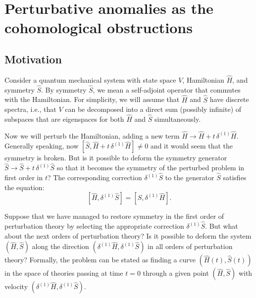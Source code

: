 \documentclass[10pt,a4paper]{amsart}
\theoremstyle{definition}
\begin{document}
\section{Perturbative anomalies as the cohomological obstructions}
\subsection{Motivation}
Consider a quantum mechanical system with state space $V$, Hamiltonian $\hat{H}$, and symmetry $\hat{S}$. By symmetry $\hat{S}$, we mean a self-adjoint operator that commutes with the Hamiltonian. For simplicity, we will assume that $\hat{H}$ and $\hat{S}$ have discrete spectra, i.e., that $V$ can be decomposed into a direct sum (possibly infinite) of subspaces that are eigenspaces for both $\hat{H}$ and $\hat{S}$ simultaneously.

Now we will perturb the Hamiltonian, adding a new term $\hat{H}\rightarrow \hat{H}+t\,\delta^{(1)}\hat{H}$. Generally speaking, now $[\hat{S}, \hat{H}+t\,\delta^{(1)}\hat{H}]\neq 0$ and it would seem that the symmetry is broken. But is it possible to deform the symmetry generator $\hat{S}\rightarrow \hat{S}+t\,\delta^{(1)}\hat{S}$ so that it becomes the symmetry of the perturbed problem in first order in $t$? The corresponding correction $\delta^{(1)}\hat{S}$ to the generator $\hat{S}$ satisfies the equation:
\begin{equation} \label{eq:linear-condition}
        [\hat{H},\delta^{(1)}\hat{S}]=[\hat{S},\delta^{(1)}\hat{H}].
    \end{equation}

Suppose that we have managed to restore symmetry in the first order of perturbation theory by selecting the appropriate correction $\delta^{(1)}\hat{S}$. But what about the next orders of perturbation theory? Is it possible to deform the system $(\hat{H},\hat{S})$ along the direction $(\delta^{(1)}\hat{H},\delta^{(1)}\hat{S})$ in all orders of perturbation theory? Formally, the problem can be stated as finding a curve $(\hat{H}(t),\hat{S}(t))$ in the space of theories passing at time $t=0$ through a given point $(\hat{H},\hat{S})$ with velocity $(\delta^{(1)}\hat{H},\delta^{(1)}\hat{S})$.
\end{document}

